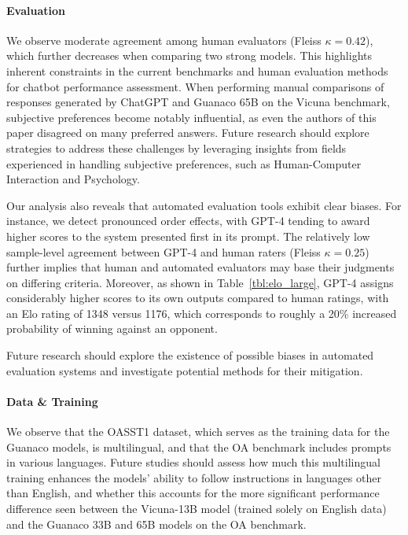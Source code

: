 \paragraph{Evaluation}

We observe moderate agreement among human evaluators (Fleiss $\kappa=0.42$), which further decreases when comparing two strong models. This highlights inherent constraints in the current benchmarks and human evaluation methods for chatbot performance assessment. When performing manual comparisons of responses generated by ChatGPT and {Guanaco} 65B on the Vicuna benchmark, subjective preferences become notably influential, as even the authors of this paper disagreed on many preferred answers. Future research should explore strategies to address these challenges by leveraging insights from fields experienced in handling subjective preferences, such as Human-Computer Interaction and Psychology.

Our analysis also reveals that automated evaluation tools exhibit clear biases. For instance, we detect pronounced order effects, with GPT-4 tending to award higher scores to the system presented first in its prompt. The relatively low sample-level agreement between GPT-4 and human raters (Fleiss $\kappa=0.25$) further implies that human and automated evaluators may base their judgments on differing criteria. Moreover, as shown in Table~\ref{tbl:elo_large}, GPT-4 assigns considerably higher scores to its own outputs compared to human ratings, with an Elo rating of 1348 versus 1176, which corresponds to roughly a 20\% increased probability of winning against an opponent.

Future research should explore the existence of possible biases in automated evaluation systems and investigate potential methods for their mitigation.

\paragraph{Data \& Training} We observe that the OASST1 dataset, which serves as the training data for the {Guanaco} models, is multilingual, and that the OA benchmark includes prompts in various languages. Future studies should assess how much this multilingual training enhances the models' ability to follow instructions in languages other than English, and whether this accounts for the more significant performance difference seen between the Vicuna-13B model (trained solely on English data) and the {Guanaco} 33B and 65B models on the OA benchmark.

